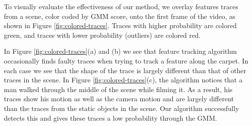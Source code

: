 To visually evaluate the effectiveness of our method, we overlay features traces 
from a scene, color coded by GMM score, onto the first frame of the video, as shown
 in Figure \ref{fig:colored-traces}.  Traces with
higher probability are colored green, and traces with lower probability (outliers) are
colored red. 

In Figure \ref{fig:colored-traces}(a) and (b) we see that feature tracking
algorithm occasionally finds faulty traces when trying to track a feature along
the carpet.  In each case we see that the shape of the trace is largely
different than that of other traces in the scene.  In Figure
\ref{fig:colored-traces}(c), the algorithm notices that a man walked through
the middle of the scene while filming it.  As a result, his traces show his
motion as well as the camera motion and are largely different than the traces
from the static objects in the scene.  Our algorithm successfully detects this
and gives these traces a low probability through the GMM.

